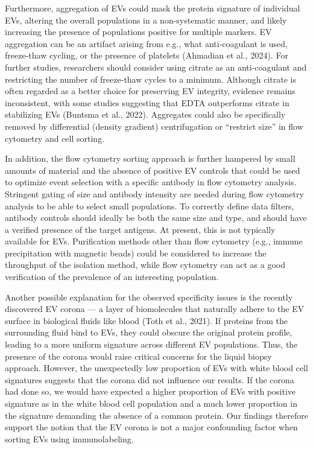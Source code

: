 \documentclass[authordate, empirical, issue]{jote-new-article}
\begin{document}
	Furthermore, aggregation of EVs could mask the protein signature of individual EVs, altering the overall populations in a non-systematic manner, and likely increasing the presence of populations positive for multiple markers. EV aggregation can be an artifact arising from e.g., what anti-coagulant is used, freeze-thaw cycling, or the presence of platelets (Ahmadian et al., 2024). For further studies, researchers should consider using citrate as an anti-coagulant and restricting the number of freeze-thaw cycles to a minimum. Although citrate is often regarded as a better choice for preserving EV integrity, evidence remains inconsistent, with some studies suggesting that EDTA outperforms citrate in stabilizing EVs (Buntsma et al., 2022). Aggregates could also be specifically removed by differential (density gradient) centrifugation or “restrict size” in flow cytometry and cell sorting.



	In addition, the flow cytometry sorting approach is further hampered by small amounts of material and the absence of positive EV controls that could be used to optimize event selection with a specific antibody in flow cytometry analysis. Stringent gating of size and antibody intensity are needed during flow cytometry analysis to be able to select small populations. To correctly define data filters, antibody controls should ideally be both the same size and type, and should have a verified presence of the target antigens. At present, this is not typically available for EVs. Purification methods other than flow cytometry (e.g., immune precipitation with magnetic beads) could be considered to increase the throughput of the isolation method, while flow cytometry can act as a good verification of the prevalence of an interesting population.



	Another possible explanation for the observed specificity issues is the recently discovered EV corona — a layer of biomolecules that naturally adhere to the EV surface in biological fluids like blood (Toth et al., 2021). If proteins from the surrounding fluid bind to EVs, they could obscure the original protein profile, leading to a more uniform signature across different EV populations. Thus, the presence of the corona would raise critical concerns for the liquid biopsy approach. However, the unexpectedly low proportion of EVs with white blood cell signatures suggests that the corona did not influence our results. If the corona had done so, we would have expected a higher proportion of EVs with positive signature as in the white blood cell population and a much lower proportion in the signature demanding the absence of a common protein. Our findings therefore support the notion that the EV corona is not a major confounding factor when sorting EVs using immunolabeling.
\end{document}
